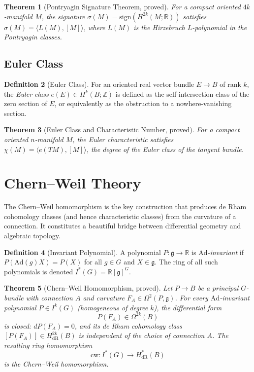 \documentclass[12pt,a4paper]{amsart}
\newtheorem{theorem}{Theorem}[section]
\theoremstyle{definition}
\newtheorem{definition}[theorem]{Definition}
\begin{document}
\begin{theorem}[Pontryagin Signature Theorem, proved]
\label{thm:signature}
For a compact oriented $4k$-manifold $M$, the signature
$\sigma(M) = \mathrm{sign}(H^{2k}(M;\mathbb{R}))$ satisfies
$\sigma(M) = \langle L(M), [M] \rangle$,
where $L(M)$ is the Hirzebruch $L$-polynomial in the Pontryagin classes.
\end{theorem}

\subsection{Euler Class}

\begin{definition}[Euler Class]
For an oriented real vector bundle $E \to B$ of rank $k$, the \emph{Euler class}
$e(E) \in H^k(B;\mathbb{Z})$ is defined as the self-intersection class of the
zero section of $E$, or equivalently as the obstruction to a nowhere-vanishing
section.
\end{definition}

\begin{theorem}[Euler Class and Characteristic Number, proved]
For a compact oriented $n$-manifold $M$, the Euler characteristic satisfies
$\chi(M) = \langle e(TM), [M] \rangle$,
the degree of the Euler class of the tangent bundle.
\end{theorem}

\section{Chern--Weil Theory}
\label{sec:chernweil}

The Chern--Weil homomorphism is the key construction that produces de Rham
cohomology classes (and hence characteristic classes) from the curvature of
a connection. It constitutes a beautiful bridge between differential geometry
and algebraic topology.

\begin{definition}[Invariant Polynomial]
A polynomial $P \colon \mathfrak{g} \to \mathbb{R}$ is \emph{$\mathrm{Ad}$-invariant}
if $P(\mathrm{Ad}(g) X) = P(X)$ for all $g \in G$ and $X \in \mathfrak{g}$.
The ring of all such polynomials is denoted $I^*(G) = \mathbb{R}[\mathfrak{g}]^G$.
\end{definition}

\begin{theorem}[Chern--Weil Homomorphism, proved]
\label{thm:chernweil}
Let $P \to B$ be a principal $G$-bundle with connection $A$ and curvature
$F_A \in \Omega^2(P, \mathfrak{g})$. For every $\mathrm{Ad}$-invariant polynomial
$P \in I^k(G)$ (homogeneous of degree $k$), the differential form
\[
  P(F_A) \in \Omega^{2k}(B)
\]
is closed: $d P(F_A) = 0$, and its de Rham cohomology class $[P(F_A)] \in
H^{2k}_{\mathrm{dR}}(B)$ is independent of the choice of connection $A$.
The resulting ring homomorphism
\[
  \mathrm{cw} \colon I^*(G) \longrightarrow H^*_{\mathrm{dR}}(B)
\]
is the \textup{Chern--Weil homomorphism}.
\end{theorem}
\end{document}
